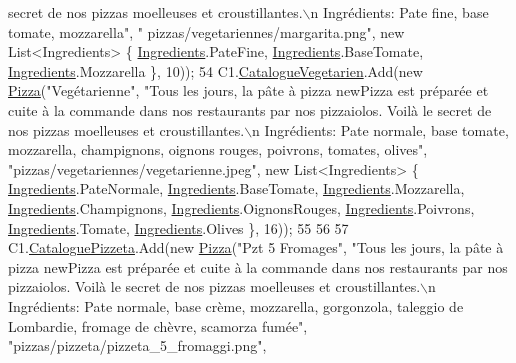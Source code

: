 \begin{DoxyCode}
{       secret de nos pizzas moelleuses et croustillantes.\(\backslash\)n Ingrédients: Pate fine, base tomate, mozzarella"}, \textcolor{stringliteral}{"
      pizzas/vegetariennes/margarita.png"}, \textcolor{keyword}{new} List<Ingredients> \{ \hyperlink{namespaceModele_a001a8e89e56a724f24a249ba98080d41}{Ingredients}.PateFine, 
      \hyperlink{namespaceModele_a001a8e89e56a724f24a249ba98080d41}{Ingredients}.BaseTomate, \hyperlink{namespaceModele_a001a8e89e56a724f24a249ba98080d41}{Ingredients}.Mozzarella \}, 10));
54             C1.\hyperlink{classModele_1_1Catalogue_abd7d6d70ddd6ba264c1c91a5b084d9ba}{CatalogueVegetarien}.Add(\textcolor{keyword}{new} \hyperlink{classModele_1_1Pizza}{Pizza}(\textcolor{stringliteral}{"Vegétarienne"}, \textcolor{stringliteral}{"Tous les jours,
       la pâte à pizza newPizza est préparée et cuite à la commande dans nos restaurants par nos pizzaiolos. Voilà
       le secret de nos pizzas moelleuses et croustillantes.\(\backslash\)n Ingrédients: Pate normale, base tomate, mozzarella,
       champignons, oignons rouges, poivrons, tomates, olives"}, \textcolor{stringliteral}{"pizzas/vegetariennes/vegetarienne.jpeg"}, \textcolor{keyword}{new} 
      List<Ingredients> \{ \hyperlink{namespaceModele_a001a8e89e56a724f24a249ba98080d41}{Ingredients}.PateNormale, \hyperlink{namespaceModele_a001a8e89e56a724f24a249ba98080d41}{Ingredients}.BaseTomate, 
      \hyperlink{namespaceModele_a001a8e89e56a724f24a249ba98080d41}{Ingredients}.Mozzarella, \hyperlink{namespaceModele_a001a8e89e56a724f24a249ba98080d41}{Ingredients}.Champignons, 
      \hyperlink{namespaceModele_a001a8e89e56a724f24a249ba98080d41}{Ingredients}.OignonsRouges, \hyperlink{namespaceModele_a001a8e89e56a724f24a249ba98080d41}{Ingredients}.Poivrons, 
      \hyperlink{namespaceModele_a001a8e89e56a724f24a249ba98080d41}{Ingredients}.Tomate, \hyperlink{namespaceModele_a001a8e89e56a724f24a249ba98080d41}{Ingredients}.Olives \}, 16));
55 
56 
57             C1.\hyperlink{classModele_1_1Catalogue_ac5490e1026b5b08d43e30b68da893423}{CataloguePizzeta}.Add(\textcolor{keyword}{new} \hyperlink{classModele_1_1Pizza}{Pizza}(\textcolor{stringliteral}{"Pzt 5 Fromages"}, \textcolor{stringliteral}{"Tous les jours, la
       pâte à pizza newPizza est préparée et cuite à la commande dans nos restaurants par nos pizzaiolos. Voilà le
       secret de nos pizzas moelleuses et croustillantes.\(\backslash\)n Ingrédients: Pate normale, base crème, mozzarella,
       gorgonzola, taleggio de Lombardie, fromage de chèvre, scamorza fumée"}, \textcolor{stringliteral}{"pizzas/pizzeta/pizzeta\_5\_fromaggi.png"}, \textcolor{keyword}{
}
\end{DoxyCode}
